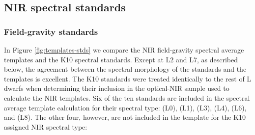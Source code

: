\documentclass[12pt]{aastex6}
\begin{document}
\subsection{NIR spectral standards}
\subsubsection{Field-gravity standards}
\label{sec:field_stds}

In Figure \ref{fig:templates-stds} we compare the NIR field-gravity spectral average templates and the K10 spectral standards.
Except at L2 and L7, as described below, the agreement between the spectral morphology of the standards and the templates is excellent. The K10 standards were treated identically to the rest of L dwarfs when determining their inclusion in the optical-NIR sample used to calculate the NIR templates.
Six of the ten standards are included in the spectral average template calculation for their spectral type:  (L0),  (L1),  (L3),  (L4),  (L6), and  (L8).
The other four, however, are not included in the template for the K10 assigned NIR spectral type:
\end{document}

